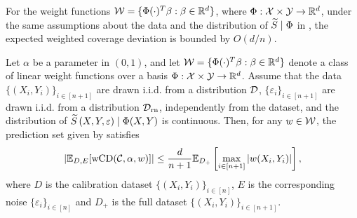 \begin{comment}
\begin{align}
    \hat{q}_y \coloneqq \arg \min_{w \in \calW} &\frac{1}{n+1} \sum_{i=1}^n \ell_\alpha (w(X_i,Y_i),\tS(S(X_i,Y_i), \varepsilon_i)) \\
    + &\frac{1}{n+1} \ell_\alpha (w(X_{n+1},y),\tS(S(X_{n+1},y), \varepsilon_{n+1}))
\end{align}
\begin{align}
    \calC_{\text{t}}(X_{n+1}) \coloneqq \{y:\tS(S(X_{n+1},y), \varepsilon_{n+1}) \leq \hat{q}_y(X_{n+1},y)\}
    \label{eq:test_time_pred_set}
\end{align}
\end{comment}

For the weight functions ${\cal W} = \{\Phi(\cdot)^T \beta :\beta \in \mathbb{R}^d\}$, where $\Phi : {\cal X} \times {\cal Y} \to \mathbb{R}^d$, under the same assumptions about the data and the distribution of ${\widetilde{S}}\mid\Phi$ in , the expected weighted coverage deviation is bounded by $O(d/n)$.

\begin{theorem}
    Let $\alpha$ be a parameter in $(0,1)$, and let ${\cal W} = \{\Phi(\cdot)^T \beta :\beta \in \mathbb{R}^d\}$ denote a class of linear weight functions over a basis $\Phi : {\cal X} \times {\cal Y} \to \mathbb{R}^d$. Assume that the data $\{(X_i,Y_i)\}_{i\in [n+1]}$ are drawn \mbox{i.i.d.} from a distribution ${\cal D}$, $\{\varepsilon_i\}_{i\in [n+1]}$ are drawn \mbox{i.i.d.} from a distribution ${\cal D}_{\text{rn}}$, independently from the dataset, and the distribution of ${\widetilde{S}}\left(X,Y, \varepsilon\right) \mid \Phi(X,Y)$ is continuous. Then, for any $w \in {\cal W}$, the prediction set given by  satisfies 
    \begin{align*}
       |\mathbb{E}_{D,E} [ \operatorname{wCD}({\cal C}, \alpha,w)]| \leq \frac{d}{n+1} \mathbb{E}_{D_{+}}\left[ \max_{i \in [n+1]}|w(X_i,Y_i)|\right],
    \end{align*}
    where $D$ is the calibration dataset $\{(X_i,Y_i)\}_{i\in[n]}$, $E$ is the corresponding noise $\{\varepsilon_i\}_{i \in [n]}$ and $D_{+}$ is the full dataset $\{(X_i,Y_i)\}_{i\in[n+1]}$.
   \label{thm:tt-cond}
\end{theorem}



